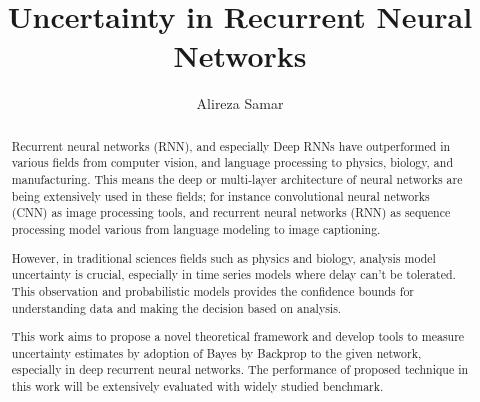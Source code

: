 \documentclass{utmthesis}
\begin{document}
\title{Uncertainty in Recurrent Neural Networks}
\author{Alireza Samar}



\maketitle



\begin{abstract}
Recurrent neural networks (RNN), and especially Deep RNNs have outperformed in various fields from computer vision, and language processing to physics, biology, and manufacturing. This means the deep or multi-layer architecture of neural networks are being extensively used in these fields; for instance convolutional neural networks (CNN) as image processing tools, and recurrent neural networks (RNN) as sequence processing model various from language modeling to image captioning.

However, in traditional sciences fields such as physics and biology, analysis model uncertainty is crucial, especially in time series models where delay can’t be tolerated. This observation and probabilistic models provides the confidence bounds for understanding data and making the decision based on analysis.

This work aims to propose a novel theoretical framework and develop tools to measure uncertainty estimates by adoption of Bayes by Backprop to the given network, especially in deep recurrent neural networks. The performance of proposed technique in this work will be extensively evaluated with widely studied benchmark.

\end{abstract}
\end{document}

